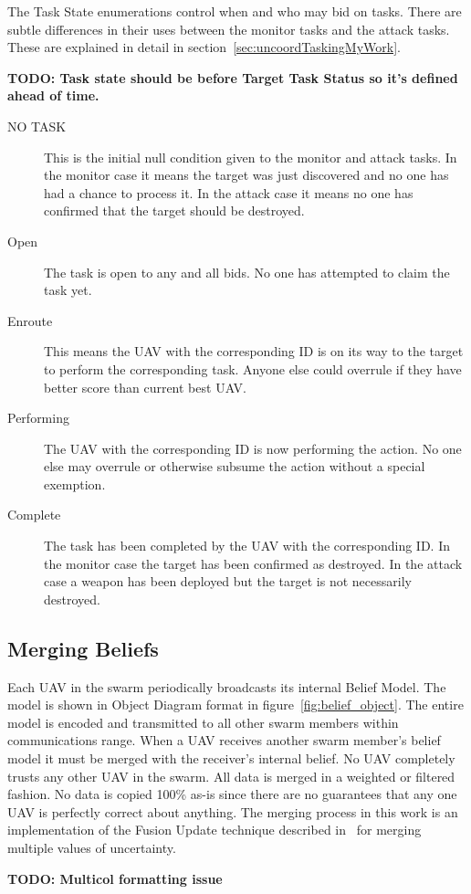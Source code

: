 \begin{multicols*}{2}
The Task State enumerations control when and who may bid on tasks.  There are subtle differences in their uses between the monitor tasks and the attack tasks.  These are explained in detail in  section~\ref{sec:uncoordTaskingMyWork}.

\textbf{TODO: Task state should be before Target Task Status so it's defined ahead of time.}

\begin{description}
	\item [NO TASK] This is the initial null condition given to the monitor and attack tasks.  In the monitor case it means the target was just discovered and no one has had a chance to process it.  In the attack case it means no one has confirmed that the target should be destroyed.
	\item [Open] The task is open to any and all bids.  No one has attempted to claim the task yet.
	\item [Enroute] This means the UAV with the corresponding ID is on its way to the target to perform the corresponding task.  Anyone else could overrule if they have better score than current best UAV.
	\item [Performing] The UAV with the corresponding ID is now performing the action.  No one else may overrule or otherwise subsume the action without a special exemption.%
	\item [Complete] The task has been completed by the UAV with the corresponding ID.  In the monitor case the target has been confirmed as destroyed.  In the attack case a weapon has been deployed but the target is not necessarily destroyed.
\end{description}

\subsection{Merging Beliefs}
\label{sec:mergingBeliefs}
Each UAV in the swarm periodically broadcasts its internal Belief Model.  The model is shown in Object Diagram format in figure~\ref{fig:belief_object}.  The entire model is encoded and transmitted to all other swarm members within communications range.   When a UAV receives another swarm member's belief model it must be merged with the receiver's internal belief.  No UAV completely trusts any other UAV in the swarm.  All data is merged in a weighted or filtered fashion.  No data is copied 100\% as-is since there are no guarantees that any one UAV is perfectly correct about anything.  The merging process in this work is an implementation of the Fusion Update technique described in~\cite{shem} for merging multiple values of uncertainty.

\textbf{TODO: Multicol formatting issue}
\end{multicols*}
